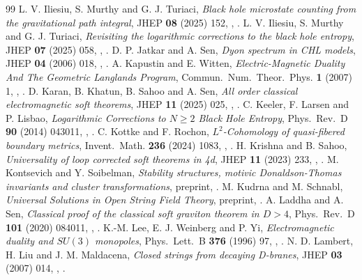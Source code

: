 \begin{thebibliography}{99}
 L. V. Iliesiu, S. Murthy and G. J. Turiaci, \emph{Black hole microstate counting from the gravitational path integral}, JHEP \textbf{08} (2025) 152, , .
 L. V. Iliesiu, S. Murthy and G. J. Turiaci, \emph{Revisiting the logarithmic corrections to the black hole entropy}, JHEP \textbf{07} (2025) 058, , .
 D. P. Jatkar and A. Sen, \emph{Dyon spectrum in CHL models}, JHEP \textbf{04} (2006) 018, , .
 A. Kapustin and E. Witten, \emph{Electric-Magnetic Duality And The Geometric Langlands Program}, Commun.\ Num.\ Theor.\ Phys. \textbf{1} (2007) 1, , .
 D. Karan, B. Khatun, B. Sahoo and A. Sen, \emph{All order classical electromagnetic soft theorems}, JHEP \textbf{11} (2025) 025, , .
 C. Keeler, F. Larsen and P. Lisbao, \emph{Logarithmic Corrections to $N\ge 2$ Black Hole Entropy}, Phys.\ Rev.\ D \textbf{90} (2014) 043011, , .
 C. Kottke and F. Rochon, \emph{$L^2$-Cohomology of quasi-fibered boundary metrics}, Invent.\ Math. \textbf{236} (2024) 1083, , .
 H. Krishna and B. Sahoo, \emph{Universality of loop corrected soft theorems in 4d}, JHEP \textbf{11} (2023) 233, , .
 M. Kontsevich and Y. Soibelman, \emph{Stability structures, motivic Donaldson-Thomas invariants and cluster transformations}, preprint, .
 M. Kudrna and M. Schnabl, \emph{Universal Solutions in Open String Field Theory}, preprint, .
 A. Laddha and A. Sen, \emph{Classical proof of the classical soft graviton theorem in $D>4$}, Phys.\ Rev.\ D \textbf{101} (2020) 084011, , .
 K.-M. Lee, E. J. Weinberg and P. Yi, \emph{Electromagnetic duality and $SU(3)$ monopoles}, Phys.\ Lett.\ B \textbf{376} (1996) 97, , .
 N. D. Lambert, H. Liu and J. M. Maldacena, \emph{Closed strings from decaying D-branes}, JHEP \textbf{03} (2007) 014, , .

\end{thebibliography}
